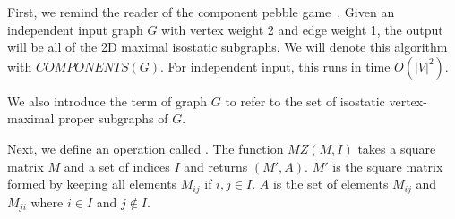 

First, we remind the reader of the component pebble game~\cite{Jacobs:1997:PG}. Given an independent input graph $G$ with vertex weight 2 and edge weight 1, the output will be all of the 2D maximal isostatic subgraphs. We will denote this algorithm with $COMPONENTS(G)$. For independent input, this runs in time $O(|V|^2)$.

We also introduce the term  of graph $G$ to refer to the set of isostatic vertex-maximal proper subgraphs of $G$.

Next, we define an operation called . The function $MZ(M, I)$ takes a square matrix $M$ and a set of indices $I$ and returns $(M', A)$. $M'$ is the square matrix formed by keeping all elements $M_{ij}$ if $i,j\in I$. $A$ is the set of elements $M_{ij}$ and $M_{ji}$ where $i\in I$ and $j\notin I$.



